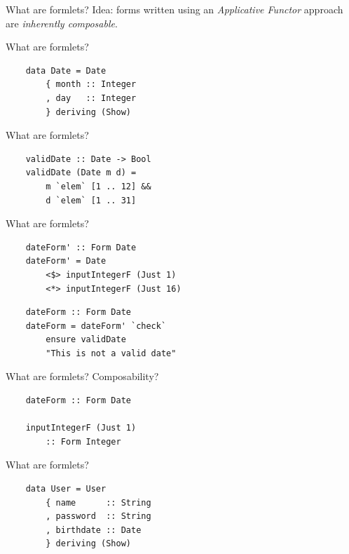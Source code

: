 \documentclass[20pt]{beamer}
\newcommand{\vspaced}{
    \vspace{5mm}
}
\begin{document}
\begin{frame}{What are formlets?}
    Idea: forms written using an \emph{Applicative Functor} approach are
    \emph{inherently composable}.
\end{frame}

\begin{frame}[fragile]{What are formlets?}
    \begin{lstlisting}
    data Date = Date
        { month :: Integer
        , day   :: Integer
        } deriving (Show)
    \end{lstlisting}
\end{frame}

\begin{frame}[fragile]{What are formlets?}
    \begin{lstlisting}
    validDate :: Date -> Bool
    validDate (Date m d) =
        m `elem` [1 .. 12] &&
        d `elem` [1 .. 31]
    \end{lstlisting}
\end{frame}

\begin{frame}[fragile]{What are formlets?}
    \begin{lstlisting}
    dateForm' :: Form Date
    dateForm' = Date
        <$> inputIntegerF (Just 1)
        <*> inputIntegerF (Just 16)
    \end{lstlisting}
    \begin{lstlisting}
    dateForm :: Form Date
    dateForm = dateForm' `check`
        ensure validDate
        "This is not a valid date"
    \end{lstlisting}
\end{frame}

\begin{frame}[fragile]{What are formlets?}
    Composability?
    \vspaced
    \begin{lstlisting}
    dateForm :: Form Date

    inputIntegerF (Just 1)
        :: Form Integer
    \end{lstlisting}
\end{frame}

\begin{frame}[fragile]{What are formlets?}
    \begin{lstlisting}
    data User = User
        { name      :: String
        , password  :: String
        , birthdate :: Date
        } deriving (Show)
    \end{lstlisting}
\end{frame}
\end{document}
